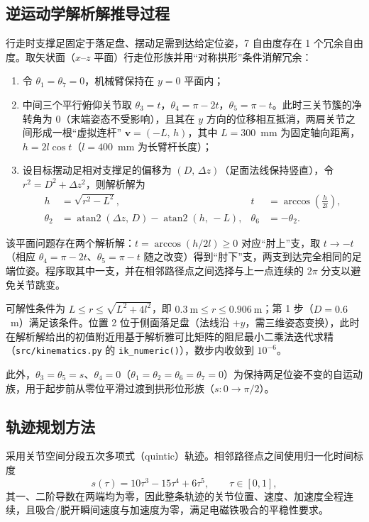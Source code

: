 \documentclass[11pt,a4paper]{ctexart}
\begin{document}
\subsection{逆运动学解析解推导过程}
行走时支撑足固定于落足盘、摆动足需到达给定位姿，7 自由度存在 1 个冗余自由度。取矢状面（$x$--$z$ 平面）行走位形族并用``对称拱形''条件消解冗余：
\begin{enumerate}
  \item 令 $\theta_1=\theta_7=0$，机械臂保持在 $y=0$ 平面内；
  \item 中间三个平行俯仰关节取 $\theta_3=t$，$\theta_4=\pi-2t$，$\theta_5=\pi-t$。此时三关节簇的净转角为 0（末端姿态不受影响），且其在 $y$ 方向的位移相互抵消，两肩关节之间形成一根``虚拟连杆'' $\bm{v}=(-L,\,h)$，其中 $L=300$~mm 为固定轴向距离，$h=2l\cos t$（$l=400$~mm 为长臂杆长度）；
  \item 设目标摆动足相对支撑足的偏移为 $(D,\,\Delta z)$（足面法线保持竖直），令 $r^2=D^2+\Delta z^2$，则解析解为
  \begin{align}
    h &= \sqrt{r^2-L^2}, & t &= \arccos\!\left(\frac{h}{2l}\right),\\
    \theta_2 &= \operatorname{atan2}(\Delta z,\,D)-\operatorname{atan2}(h,\,-L), & \theta_6 &= -\theta_2.
  \end{align}
\end{enumerate}
该平面问题存在两个解析解：$t=\arccos(h/2l)\ge 0$ 对应``肘上''支，取 $t\to-t$（相应 $\theta_4=\pi-2t$、$\theta_5=\pi-t$ 随之改变）得到``肘下''支，两支到达完全相同的足端位姿。程序取其中一支，并在相邻路径点之间选择与上一点连续的 $2\pi$ 分支以避免关节跳变。

可解性条件为 $L\le r\le\sqrt{L^2+4l^2}$，即 $0.3~\text{m}\le r\le 0.906~\text{m}$；第 1 步（$D=0.6$~m）满足该条件。位置 2 位于侧面落足盘（法线沿 $+y$，需三维姿态变换），此时在解析解给出的初值附近用基于解析雅可比矩阵的阻尼最小二乘法迭代求精（\texttt{src/kinematics.py} 的 \texttt{ik\_numeric()}），数步内收敛到 $10^{-6}$。

此外，$\theta_3=\theta_5=s$、$\theta_4=0$（$\theta_1=\theta_2=\theta_6=\theta_7=0$）为保持两足位姿不变的自运动族，用于起步前从零位平滑过渡到拱形位形族（$s\colon 0\to\pi/2$）。

\subsection{轨迹规划方法}
采用关节空间分段五次多项式（quintic）轨迹。相邻路径点之间使用归一化时间标度
\begin{equation}
  s(\tau)=10\tau^3-15\tau^4+6\tau^5,\qquad \tau\in[0,1],
\end{equation}
其一、二阶导数在两端均为零，因此整条轨迹的关节位置、速度、加速度全程连续，且吸合/脱开瞬间速度与加速度为零，满足电磁铁吸合的平稳性要求。
\end{document}
